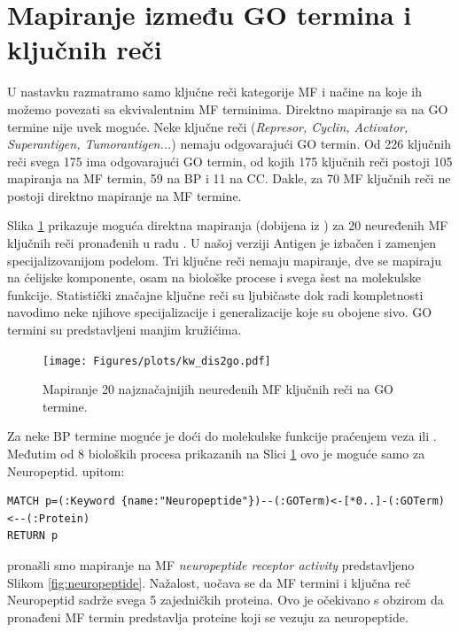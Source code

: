 \section{Mapiranje između GO termina i \swissprot ključnih reči}

U nastavku razmatramo samo ključne reči kategorije MF
i načine na koje ih možemo povezati sa ekvivalentnim MF terminima.
Direktno mapiranje sa  na GO
termine nije uvek moguće.  Neke ključne reči (\textit{Represor, Cyclin, Activator,
Superantigen, Tumorantigen...}) nemaju odgovarajući GO termin. Od 226 ključnih
reči svega 175 ima odgovarajući GO termin, od kojih 175 ključnih reči
postoji 105 mapiranja na MF termin, 59 na BP
i 11 na CC.  Dakle, za 70 MF ključnih reči ne postoji direktno mapiranje na MF
termine.

Slika \ref{fig:KWtop20dis} prikazuje moguća direktna mapiranja
(dobijena iz ) za 20 neuređenih MF ključnih reči pronađenih
u radu \parencite{Xie2007}.  U našoj verziji  Antigen je
izbačen i zamenjen specijalizovanijom podelom. Tri ključne reči nemaju
mapiranje, dve se mapiraju na ćelijske komponente, osam na biološke procese i
svega šest na molekulske funkcije. Statistički značajne ključne reči su
ljubičaste dok radi kompletnosti navodimo neke njihove specijalizacije i
generalizacije koje su obojene sivo. GO termini su predstavljeni manjim
kružićima. 

\begin{figure}[th]
\hspace*{-2.2cm} 
\texttt{[image: Figures/plots/kw\_dis2go.pdf]}
\decoRule
\caption {
  Mapiranje 20 najznačajnijih neuređenih MF ključnih reči \parencite{Xie2007} 
  na GO termine.
}
\label{fig:KWtop20dis}
\end{figure}

Za neke BP termine moguće je doći do molekulske funkcije praćenjem veza  ili . Međutim od 8 bioloških procesa prikazanih na Slici
\ref{fig:KWtop20dis} ovo je moguće samo za Neuropeptid.
 upitom:
\begin{verbatim}
MATCH p=(:Keyword {name:"Neuropeptide"})--(:GOTerm)<-[*0..]-(:GOTerm)<--(:Protein)
RETURN p
\end{verbatim}
pronašli smo mapiranje na MF \textit{neuropeptide receptor activity}
predstavljeno Slikom \ref{fig:neuropeptide}.  Nažalost, uočava se da MF termini
i ključna reč Neuropeptid sadrže svega 5 zajedničkih proteina. Ovo je očekivano
s obzirom da pronađeni MF termin predstavlja proteine koji se vezuju za
neuropeptide.

